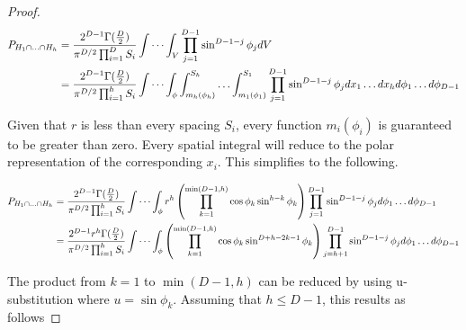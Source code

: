 \documentclass{article}
\begin{document}
\begin{proof}
	\begin{align}
		P_{H_1\cap\hdots\cap H_h} &= \frac{2^{D-1}\Gamma(\frac{D}{2})}{\pi^{D/2}\prod_{i=1}^D S_i} \idotsint_V \prod_{j=1}^{D-1}\sin^{D-1-j}\phi_j dV \\
		&= \frac{2^{D-1}\Gamma(\frac{D}{2})}{\pi^{D/2}\prod_{i=1}^h S_i} \idotsint_{\phi}  \int_{m_h(\phi_h)}^{S_h} \hdots \int_{m_1(\phi_1)}^{S_1} \prod_{j=1}^{D-1}\sin^{D-1-j}\phi_j dx_1\hdots dx_h d\phi_1 \hdots d\phi_{D-1}
	\end{align}


	Given that $r$ is less than every spacing $S_i$, every function $m_i(\phi_i)$ is guaranteed
	to be greater than zero. Every spatial integral will reduce to the polar representation of
	the corresponding $x_i$. This simplifies to the following.

	\begin{align}
		P_{H_1\cap\hdots\cap H_h} &= \frac{2^{D-1}\Gamma(\frac{D}{2})}{\pi^{D/2}\prod_{i=1}^h S_i} \idotsint_\phi r^h \left( \prod_{k=1}^{\min(D-1, h)} \cos\phi_k\sin^{h-k}\phi_k\right) \prod_{j=1}^{D-1}\sin^{D-1-j}\phi_j d\phi_1 \hdots d\phi_{D-1} \\
		&= \frac{2^{D-1}r^h\Gamma(\frac{D}{2})}{\pi^{D/2}\prod_{i=1}^h S_i} \idotsint_\phi \left( \prod_{k=1}^{\min(D-1, h)} \cos\phi_k\sin^{D+h-2k-1}\phi_k\right) \prod_{j=h+1}^{D-1}\sin^{D-1-j}\phi_j d\phi_1 \hdots d\phi_{D-1}
	\end{align}

	The product from $k=1$ to $\min(D-1,h)$ can be reduced by using u-substitution where 
	$u=\sin\phi_k$. Assuming that $h\le D-1$, this results as follows


\end{proof}
\end{document}
